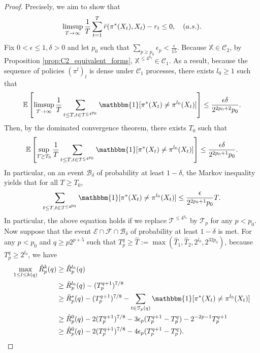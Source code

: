 \documentclass[aos]{imsart}
\theoremstyle{plain}
\theoremstyle{remark}
\newcommand{\Bcal}{\mathcal{B}}
\newcommand{\Ccal}{\mathcal{C}}
\newcommand{\Ecal}{\mathcal{E}}
\newcommand{\Fcal}{\mathcal{F}}
\newcommand{\Tcal}{\mathcal{T}}
\newcommand{\Ebb}{\mathbb{E}}
\newcommand{\Xbb}{\mathbb{X}}
\newcommand{\1}{\mathbbm{1}}%
\renewcommand{\limsup}{\mathop{\rm limsup}}
\begin{document}
\begin{proof}
Precisely, we aim to show that
\begin{equation*}
    \limsup_{T\to\infty}\frac{1}{T}\sum_{t=1}^T \bar r(\pi^*(X_t), X_t)-r_t\leq 0,\quad (a.s.).
\end{equation*}
Fix $0<\epsilon\leq 1,\delta>0$ and let $p_0$ such that $\sum_{p\geq p_0}\epsilon_p<\frac{\epsilon}{15}$. Because $\Xbb\in\Ccal_2$, by Proposition \ref{prop:C2_equivalent_forms}, $\Xbb^{\leq 4^{p_0}}\in\Ccal_1$. As a result, because the sequence of policies $(\pi^l)_l$ is dense under $\Ccal_1$ processes, there exists $l_0\geq 1$ such that
\begin{equation*}
    \Ebb\left[\limsup_{T\to\infty}\frac{1}{T} \sum_{t\leq T, t\in\Tcal^{\leq 4^{p_0}}} \1[\pi^*(X_t)\neq\pi^{l_0}(X_t)]\right]\leq \frac{\epsilon\delta}{2^{2p_0+2}p_0}.
\end{equation*}
Then, by the dominated convergence theorem, there exists $T_0$ such that
\begin{equation*}
    \Ebb\left[\sup_{T\geq T_0}\frac{1}{T} \sum_{t\leq T, t\in\Tcal^{\leq 4^{p_0}}} \1[\pi^*(X_t)\neq\pi^{l_0}(X_t)]\right]\leq \frac{\epsilon\delta}{2^{2p_0+1}p_0}.
\end{equation*}
In particular, on an event $\Bcal_\delta$ of probability at least $1-\delta$, the Markov inequality yields that for all $T\geq T_0$,
\begin{equation*}
    \sum_{t\leq T, t\in\Tcal^{\leq 4^{p_0}}} \1[\pi^*(X_t)\neq\pi^{l_0}(X_t)] \leq \frac{\epsilon}{2^{2p_0+1}p_0}T.
\end{equation*}
In particular, the above equation holds if we replace $\Tcal^{\leq 4^{p_0}}$ by $\Tcal_p$ for any $p<p_0$.
Now suppose that the event $\Ecal\cap\Fcal\cap \Bcal_\delta$ of probability at least $1-\delta$ is met. For any $p<p_0$ and $q\geq p2^{p+5}$ such that $T^q_p\geq \hat T:=\max( \hat T_1,\hat T_2,2^{l_0},2^{32p_0})$, because $T^q_p\geq 2^{l_0} $, we have
\begin{align*}
    \max_{1\leq l\leq k(q)}\hat R_p^k(q) 
    &\geq \hat R_p^{l_0}(q)\\
    &\geq \bar R^{l_0}_p(q)  -(T_p^{q+1})^{7/8}\\
    &\geq \bar R_p^*(q)  -(T_p^{q+1})^{7/8} - \sum_{t\in\Tcal_p(q)}\1[\pi^*(X_t)\neq\pi^{l_0}(X_t)]
    \\
    &\geq \hat R_p^0(q) - 2(T_p^{q+1})^{7/8} - 3\epsilon_p (T_p^{q+1}-T_p^q) - 2^{-2p-1}T_p^{q+1}\\
    &\geq \hat R_p^0(q) - 2(T_p^{q+1})^{7/8} - 4\epsilon_p (T_p^{q+1}-T_p^q).
\end{align*}

\end{proof}
\end{document}
